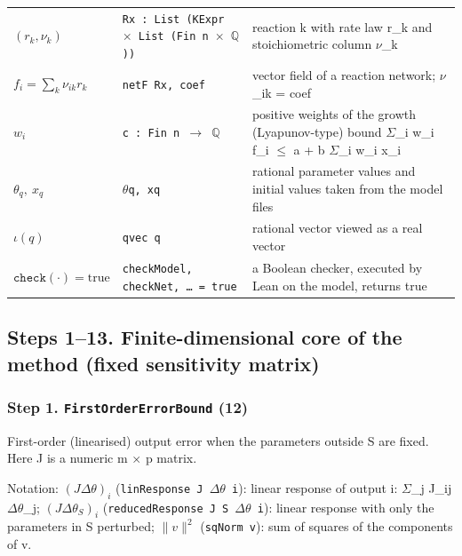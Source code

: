 {\begin{longtable}{@{}>{\raggedright\arraybackslash}p{4.0cm}>{\raggedright\arraybackslash}p{4.6cm}>{\raggedright\arraybackslash}p{7.2cm}@{}}
$(r_k,\nu_k)$ & \texttt{Rx : List (KExpr $\times$ List (Fin n $\times$ $\mathbb Q$))} & reaction k with rate law r\_k and stoichiometric column $\nu$\_k \\
$f_i=\sum_k\nu_{ik}r_k$ & \texttt{netF Rx, coef} & vector field of a reaction network; $\nu$\_ik = coef \\
$w_i$ & \texttt{c : Fin n $\to$ $\mathbb Q$} & positive weights of the growth (Lyapunov-type) bound $\Sigma$\_i w\_i f\_i $\le$ a + b $\Sigma$\_i w\_i x\_i \\
$\theta_q,\ x_q$ & \texttt{$\theta$q, xq} & rational parameter values and initial values taken from the model files \\
$\iota(q)$ & \texttt{qvec q} & rational vector viewed as a real vector \\
$\mathtt{check}(\cdot)=\mathrm{true}$ & \texttt{checkModel, checkNet, \dots{} = true} & a Boolean checker, executed by Lean on the model, returns true \\
\bottomrule
\end{longtable}
}

\subsection*{Steps 1--13. Finite-dimensional core of the method (fixed sensitivity matrix)}

\subsubsection*{Step 1. \texttt{FirstOrderErrorBound} (12)}
First-order (linearised) output error when the parameters outside S are fixed. Here J is a numeric m $\times$ p matrix.

{\small\raggedright Notation: $(J\Delta\theta)_i$ (\texttt{linResponse J $\Delta\theta$ i}): linear response of output i: $\Sigma$\_j J\_ij $\Delta\theta$\_j; $(J\Delta\theta_S)_i$ (\texttt{reducedResponse J S $\Delta\theta$ i}): linear response with only the parameters in S perturbed; $\|v\|^2$ (\texttt{sqNorm v}): sum of squares of the components of v.}

